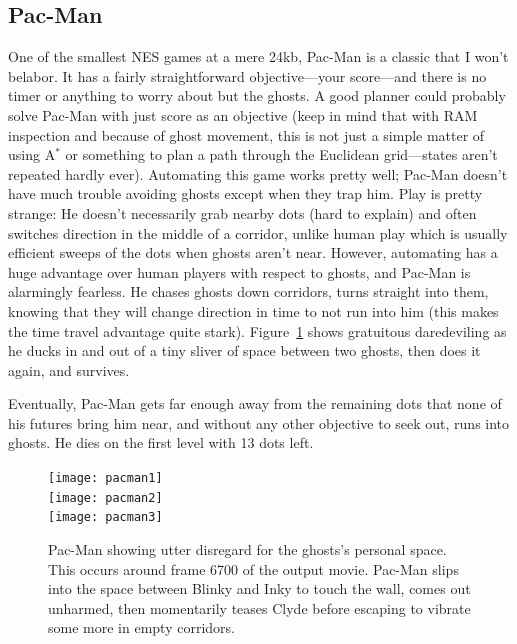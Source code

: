 \documentclass[twocolumn]{article}
\begin{document}
\subsection{Pac-Man}

One of the smallest NES games at a mere 24kb, Pac-Man is a classic
that I won't belabor. It has a fairly straightforward objective---your
score---and there is no timer or anything to worry about but the
ghosts. A good planner could probably solve Pac-Man with just score as
an objective (keep in mind that with RAM inspection and because of
ghost movement, this is not just a simple matter of using A$^{*}$ or
something to plan a path through the Euclidean grid---states aren't
repeated hardly ever). Automating this game works pretty well; Pac-Man
doesn't have much trouble avoiding ghosts except when they trap him.
Play is pretty strange: He doesn't necessarily grab nearby dots (hard
to explain) and often switches direction in the middle of a corridor,
unlike human play which is usually efficient sweeps of the dots when
ghosts aren't near. However, automating has a huge advantage over
human players with respect to ghosts, and Pac-Man is alarmingly
fearless. He chases ghosts down corridors, turns straight into them,
knowing that they will change direction in time to not run into him
(this makes the time travel advantage quite stark).
Figure~\ref{fig:pacman} shows gratuitous daredeviling as he ducks in
and out of a tiny sliver of space between two ghosts, then does it
again, and survives.

Eventually, Pac-Man gets far enough away from the remaining dots that
none of his futures bring him near, and without any other objective
to seek out, runs into ghosts. He dies on the first level with 13 dots
left.

\begin{figure}[h!t!]
\begin{center}
\texttt{[image: pacman1]} \\[0.3em]
\texttt{[image: pacman2]} \\[0.3em]
\texttt{[image: pacman3]}
\end{center}\vspace{-0.1in}
\caption{Pac-Man showing utter disregard for the ghosts's personal
  space. This occurs around frame 6700 of the output movie. Pac-Man
  slips into the space between Blinky and Inky to touch the wall,
  comes out unharmed, then momentarily teases Clyde before escaping
  to vibrate some more in empty corridors.}
\label{fig:pacman}
\end{figure}
\end{document}
